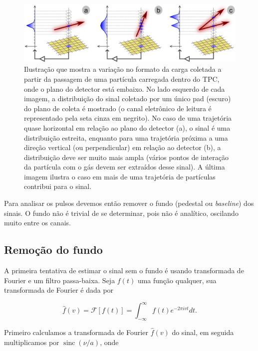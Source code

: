 \documentclass[a4paper,12pt,oneside]{book}
\DeclareMathOperator{\sinc}{sinc}
\begin{document}
\begin{figure}[H]
    \centering
    \includegraphics[scale = 0.325]{figs/get.png}
    \caption{Ilustração que mostra a variação no formato da carga coletada a partir da passagem de uma partícula carregada dentro do TPC, onde o plano do detector está embaixo. No lado esquerdo de cada imagem, a distribuição do sinal coletado por um único pad (escuro) do plano de coleta é mostrado (o canal eletrônico de leitura é representado pela seta cinza em negrito). No caso de uma trajetória quase horizontal em relação ao plano do detector (a), o sinal é uma distribuição estreita, enquanto para uma trajetória próxima a uma direção vertical (ou perpendicular) em relação ao detector (b), a distribuição deve ser muito mais ampla (vários pontos de interação da partícula com o gás devem ser extraídos desse sinal). A última imagem ilustra o caso em mais de uma trajetória de partículas contribui para o sinal\cite{GET}.}
    \label{fig:get_signal}
\end{figure}

\par Para analisar os pulsos devemos então remover o fundo (pedestal ou \textit{baseline}) dos sinais. O fundo não é trivial de se determinar, pois não é analítico, oscilando muito entre os canais.

\subsection{Remoção do fundo}\label{subsec:pulses_baseline}

A primeira tentativa de estimar o sinal sem o fundo é usando transformada de Fourier e um filtro passa-baixa. Seja $f(t)$ uma função qualquer, sua transformada de Fourier é dada por

\begin{equation} \label{eq:fourier}
    \hat{f}(v)=\mathscr{F}[f(t)]=\int_{-\infty}^{\infty} f(t) e^{-2 \pi i v t} d t.
\end{equation}

\par Primeiro calculamos a transformada de Fourier $\hat{f}(v)$ do sinal, em seguida multiplicamos por $\sinc(\nu / a)$, onde
\end{document}

